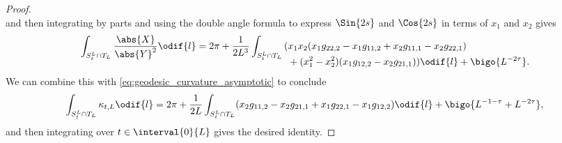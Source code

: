 \documentclass[titlepage,numbers=noenddot,oneside,%
cleardoublepage=empty,paper=a4,fontsize=11pt,%
english,%
]{scrartcl}
\begin{document}
\begin{proof}
\begin{equation*}
    \end{equation*}
    and then integrating by parts and using the double angle formula to express \( \Sin{2s} \) and \( \Cos{2s} \) in terms of \( x_1 \) and \( x_2 \) gives
    \begin{equation*}
        \int_{S_t^L\cap T_L}\frac{\abs{X}}{\abs{Y}^2}\odif{l}=2\pi+\frac{1}{2L^3}\int_{S_t^L\cap T_L}\begin{aligned}[t]
            (&x_1x_2(x_1 g_{22,2}-x_1 g_{11,2}+x_2 g_{11,1}-x_2 g_{22,1})\\
            &+(x_1^2-x_2^2)(x_1 g_{12,2}-x_2 g_{21,1}))\odif{l}+\bigo{L^{-2\tau}}.
        \end{aligned}
    \end{equation*}
    We can combine this with \cref{eq:geodesic_curvature_asymptotic} to conclude
    \begin{equation*}
        \int_{S_t^L \cap T_L}\kappa_{t,L}\odif{l}=2\pi+\frac{1}{2L}\int_{S_t^L \cap T_L}(x_2 g_{11,2}-x_2 g_{21,1}+x_1 g_{22,1}-x_1 g_{12,2})\odif{l}+\bigo{L^{-1-\tau}+L^{-2\tau}},
    \end{equation*}
    and then integrating over \( t\in \interval{0}{L} \) gives the desired identity.
\end{proof}
\end{document}
